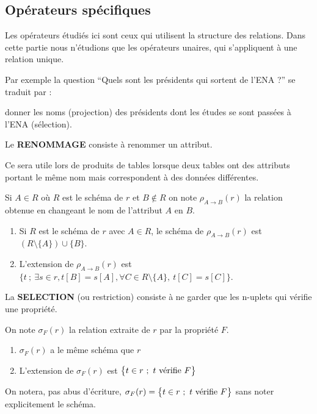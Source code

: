 \subsection{Opérateurs spécifiques}
Les opérateurs étudiés ici sont ceux qui utilisent la structure des relations. Dans cette partie nous n'étudions que les opérateurs unaires, qui s'appliquent à une relation unique.

Par exemple la question ``Quels sont les présidents qui sortent de l'ENA ?'' se traduit par :

donner les noms (projection) des présidents dont les études se sont passées à l'ENA (sélection).

\medskip

Le {\bf RENOMMAGE} consiste à renommer un attribut. 

Ce sera utile lors de produits de tables lorsque deux tables ont des attributs portant le même nom mais correspondent à des données différentes.

Si $A\in R$ où $R$ est le schéma de $r$ et $B\not\in R$ on note $\rho_{A \rightarrow B}(r)$ la relation obtenue en changeant le nom de l'attribut $A$ en $B$. 
\begin{enumerate}
\item Si $R$ est le schéma de $r$ avec $A\in R$, le schéma de $\rho_{A \rightarrow B}(r)$ est $(R\setminus\{A\})\cup\{B\}$.
\item L'extension de $\rho_{A \rightarrow B}(r)$ est $\bigl\{t\ ;\   \exists s\in r, t[B]=s[A], \forall C\in R\setminus\{A\},\  t [ C ]=s [C ]\bigr\}$.
\end{enumerate}
\medskip

La {\bf SELECTION} (ou restriction) consiste à ne garder que les n-uplets qui vérifie une propriété. 

On note $\sigma_F(r)$ la relation extraite de $r$ par la propriété $F$.
\begin{enumerate}
\item $\sigma_F(r)$ a le même schéma que $r$
\item L'extension de $\sigma_F(r)$ est $\bigl\{t\in r\ ;\  t\hbox{ vérifie }F\bigr\}$
\end{enumerate}
On notera, pas abus d'écriture, $\sigma_F(r)=\bigl\{t\in r\ ;\  t\hbox{ vérifie }F\bigr\}$ sans noter explicitement le schéma.

